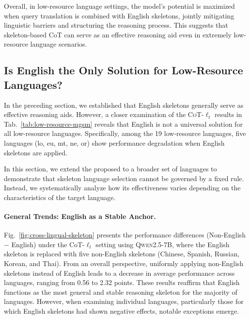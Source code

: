 Overall, in low-resource language settings, the model's potential is maximized when query translation is combined with English skeletons, jointly mitigating linguistic barriers and structuring the reasoning process. This suggests that skeleton-based CoT can serve as an effective reasoning aid even in extremely low-resource language scenarios.


\subsection{Is English the Only Solution for Low-Resource Languages?}
\label{sec:low-resource-nonen}
In the preceding section, we established that English skeletons generally serve as effective reasoning aids. However, a closer examination of the \textsc{CoT-$\ell_t$} results in Tab.~\ref{tab:low-resource-mgsm} reveals that English is not a universal solution for all low-resource languages. Specifically, among the 19 low-resource languages, five languages (lo, eu, mt, ne, or) show performance degradation when English skeletons are applied.

In this section, we extend the proposed \LASEF to a broader set of languages to demonstrate that skeleton language selection cannot be governed by a fixed rule. Instead, we systematically analyze how its effectiveness varies depending on the characteristics of the target language.


\paragraph{General Trends: English as a Stable Anchor.}
Fig.~\ref{fig:cross-lingual-skeleton} presents the performance differences (Non-English − English) under the CoT-$\ell_t$ setting using \textsc{Qwen2.5-7B}, where the English skeleton is replaced with five non-English skeletons (Chinese, Spanish, Russian, Korean, and Thai). From an overall perspective, uniformly applying non-English skeletons instead of English leads to a decrease in average performance across languages, ranging from 0.56 to 2.32 points. These results reaffirm that English functions as the most general and stable reasoning skeleton for the majority of languages. However, when examining individual languages, particularly those for which English skeletons had shown negative effects, notable exceptions emerge.


